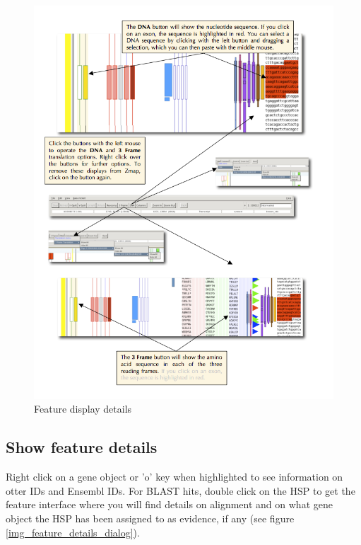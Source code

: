 \documentclass[letterpaper]{article}
\begin{document}
\begin{figure}
\centering
\color[rgb]{0.30980393,0.5058824,0.7411765}
\includegraphics[width=15.231cm]{img_feature_display_details.png}
\caption{Feature display details}
\label{img_feature_display_details}
\end{figure}


\subsection{Show feature details}
Right click on a gene object or 'o' key when highlighted to see information on otter IDs and Ensembl IDs. For BLAST hits, double click on the HSP to get the feature interface where you will find details on alignment and on what gene object the HSP has been assigned to as evidence, if any (see figure \ref{img_feature_details_dialog}).
\end{document}
